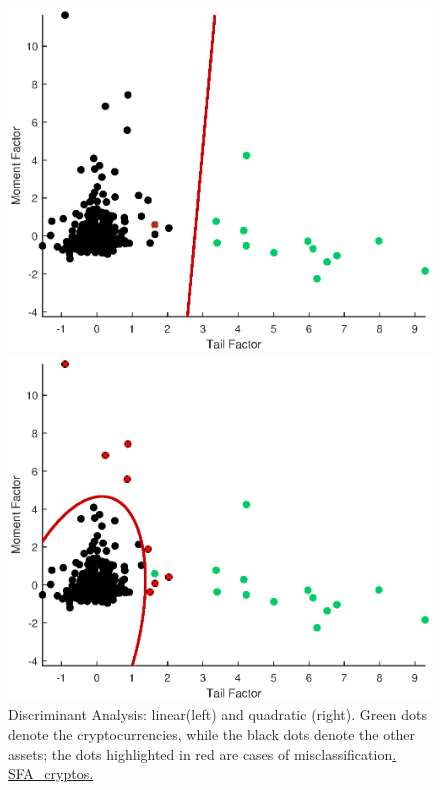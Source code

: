 \begin{figure}[!ht]
\begin{minipage}[b]{0.48\textwidth}

\centering
\includegraphics[width=1\textwidth]{Fig/figure_8a}


\end{minipage}
\begin{minipage}[b]{0.48\textwidth}

\centering
\includegraphics[width=1\textwidth]{Fig/figure_8b}


\end{minipage}
\caption{ Discriminant Analysis: linear(left) and quadratic (right). Green dots denote the cryptocurrencies, while the black dots denote the other assets; the dots highlighted in red are cases of misclassification\href{https://github.com/QuantLet/Genus_proximum_cryptos/tree/master/SFA_Cryptos}{. SFA\_cryptos.}}
	\label{fig:figure_8}
\end{figure}

